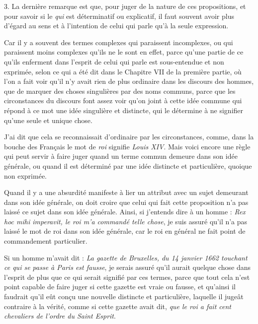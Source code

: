 \bigbreak
{3.} La dernière remarque est que, pour juger de la nature de ces propositions, et pour savoir si le \emph{qui} est déterminatif ou explicatif, il faut souvent avoir plus d'égard au sens et à l'intention de celui qui parle qu'à la seule expression.

Car il y a souvent des termes complexes qui paraissent incomplexes, ou qui paraissent moins complexes qu'ils ne le sont en effet, parce qu'une partie de ce qu'ils enferment dans l'esprit de celui qui parle est sous-entendue et non exprimée, selon ce qui a été dit dans le Chapitre VII de la première partie, où l'on a fait voir qu'il n'y avait rien de plus ordinaire dans les discours des hommes, que de marquer des choses singulières par des noms communs, parce que les circonstances du discours font assez voir qu'on joint à cette idée commune qui répond à ce mot une idée singulière et distincte, qui le détermine à ne signifier qu'une seule et unique chose.

J'ai dit que cela se reconnaissait d'ordinaire par les circonstances, comme, dans la bouche des Français le mot de \emph{roi} signifie \emph{Louis XIV}. Mais voici encore une règle qui peut servir à faire juger quand un terme commun demeure dans son idée générale, ou quand il est déterminé par une idée distincte et particulière, quoique non exprimée.

Quand il y a une absurdité manifeste à lier un attribut avec un sujet demeurant dans son idée générale, on doit croire que celui qui fait cette proposition n'a pas laissé ce sujet dans son idée générale. Ainsi, si j'entends dire à un homme : \emph{Rex hoc mihi imperavit, le roi m'a commandé telle chose}, je suis assuré qu'il n'a pas laissé le mot de roi dans son idée générale, car le roi en général ne fait point de commandement particulier.

Si un homme m'avait dit : \emph{La gazette de Bruxelles, du 14 janvier 1662 touchant ce qui se passe à Paris est fausse}, je serais assuré qu'il aurait quelque chose dans l'esprit de plus que ce qui serait signifié par ces termes, parce que tout cela n'est point capable de faire juger si cette gazette est vraie ou fausse, et qu'ainsi il faudrait qu'il eût conçu une nouvelle distincte et particulière, laquelle il jugeât contraire à la vérité, comme si cette gazette avait dit, \emph{que le roi a fait cent chevaliers de l'ordre du Saint Esprit}.

